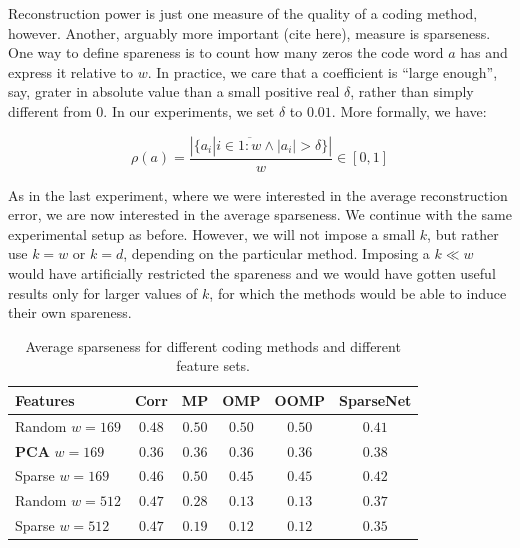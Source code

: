 \documentclass[12pt,a4paper,oneside,english]{UPBThesis}
\newcommand{\hcrange}[2]{\overline{{#1}\colon\!\!{#2}}}
\begin{document}
Reconstruction power is just one measure of the quality of a coding method, however. Another, arguably more important (cite here), measure is sparseness. One way to define spareness is to count how many zeros the code word $a$ has and express it relative to $w$. In practice, we care that a coefficient is ``large enough'', say, grater in absolute value than a small positive real $\delta$, rather than simply different from $0$. In our experiments, we set $\delta$ to $0.01$. More formally, we have:

\begin{equation*}
\rho(a) = \frac{\left| \{ a_i \left|\right. i \in \hcrange{1}{w} \wedge \left|a_i\right| > \delta \} \right|}{w} \in [0,1]
\end{equation*}

As in the last experiment, where we were interested in the average reconstruction error, we are now interested in the average sparseness. We continue with the same experimental setup as before. However, we will not impose a small $k$, but rather use $k=w$ or $k=d$, depending on the particular method. Imposing a $k \ll w$ would have artificially restricted the spareness and we would have gotten useful results only for larger values of $k$, for which the methods would be able to induce their own spareness. 

\renewcommand{\arraystretch}{1.2}
\begin{table}
  \caption{Average sparseness for different coding methods and different feature sets.}
  \label{table:RecSparseSparseness}
  \begin{tabularx}{\textwidth}{|R|c|c|c|c|c|}
    \hline
    Features & \textbf{Corr} & \textbf{MP} & \textbf{OMP} & \textbf{OOMP} & SparseNet \tabularnewline \hline\hline
    Random $w=169$ & $0.48$ & $0.50$ & $0.50$ & $0.50$ & $0.41$ \tabularnewline \hline
    \textbf{PCA} $w=169$ & $0.36$ & $0.36$ & $0.36$ & $0.36$ & $0.38$ \tabularnewline \hline
    Sparse $w=169$ & $0.46$ & $0.50$ & $0.45$ & $0.45$ & $0.42$ \tabularnewline \hline
    Random $w=512$ & $0.47$ & $0.28$ & $0.13$ & $0.13$ & $0.37$ \tabularnewline \hline
    Sparse $w=512$ & $0.47$ & $0.19$ & $0.12$ & $0.12$ & $0.35$ \tabularnewline
    \hline
  \end{tabularx}
\end{table}
\renewcommand{\arraystretch}{1.0}
\end{document}
